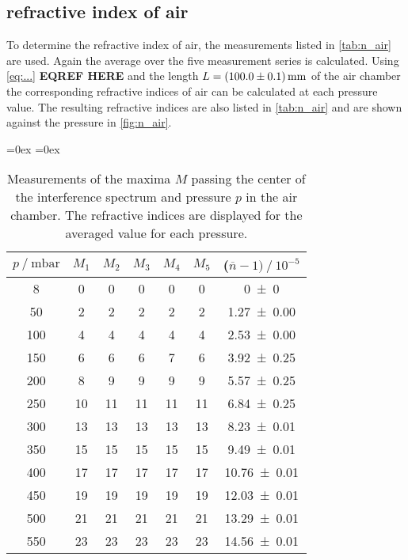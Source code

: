 \subsection{refractive index of air}
To determine the refractive index of air, the measurements listed in \autoref{tab:n_air} are used.
Again the average over the five measurement series is calculated. Using \autoref{eq:...} \textbf{EQREF HERE} and the length $L = \qty{100 +- 0.1}{\milli\metre}$ of the air chamber 
the corresponding refractive indices of air can be calculated at each 
pressure value. The resulting refractive indices are also listed in \autoref{tab:n_air} and are shown against the pressure in \autoref{fig:n_air}.
\begin{table}
  \centering
  \aboverulesep=0ex %
  \belowrulesep=0ex %
  \caption{Measurements of the maxima $M$ passing the center of the interference spectrum and pressure $p$ in the air chamber. 
  The refractive indices are displayed for the averaged value for each pressure.}
  \label{tab:n_air}
  \begin{tabular}{c | c c c c c | c}
    \toprule
    {$p \mathbin{/} \unit{\milli\bar}$} & {$M_1$} & {$M_2$} & {$M_3$} & {$M_4$} & {$M_5$} & {($\overline{n} -1) \mathbin{/} 10^{-5}$}\\
    \midrule
    \rule{0pt}{1.1EM}
    {  8} & { 0} & { 0} & { 0} & { 0} & { 0} & \num{0 +-0}\\
    { 50} & { 2} & { 2} & { 2} & { 2} & { 2} & \num{1.27+-0.00}\\
    {100} & { 4} & { 4} & { 4} & { 4} & { 4} & \num{2.53+-0.00}\\
    {150} & { 6} & { 6} & { 6} & { 7} & { 6} & \num{3.92+-0.25}\\
    {200} & { 8} & { 9} & { 9} & { 9} & { 9} & \num{5.57+-0.25}\\
    {250} & {10} & {11} & {11} & {11} & {11} & \num{6.84+-0.25}\\
    {300} & {13} & {13} & {13} & {13} & {13} & \num{8.23+-0.01}\\
    {350} & {15} & {15} & {15} & {15} & {15} & \num{9.49+-0.01}\\
    {400} & {17} & {17} & {17} & {17} & {17} & \num{10.76+-0.01}\\
    {450} & {19} & {19} & {19} & {19} & {19} & \num{12.03+-0.01}\\
    {500} & {21} & {21} & {21} & {21} & {21} & \num{13.29+-0.01}\\
    {550} & {23} & {23} & {23} & {23} & {23} & \num{14.56+-0.01}\\

\end{tabular}
\end{table}

